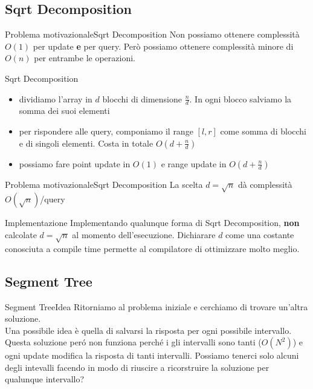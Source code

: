 \documentclass[compress]{beamer}
\begin{document}
\subsection{Sqrt Decomposition}
\begin{frame}{Problema motivazionale}{Sqrt Decomposition}
    Non possiamo ottenere complessit\`a $O(1)$ per update \textbf{e} per query. Per\`o possiamo ottenere complessit\`a minore di $O(n)$ per entrambe le operazioni.
    \pause
    \begin{block}{Sqrt Decomposition}
        \begin{itemize}
        \item dividiamo l'array in $d$ blocchi di dimensione $\frac{n}{d}$. In ogni blocco salviamo la somma dei suoi elementi
        \pause
        \item per rispondere alle query, componiamo il range $[l, r]$ come somma di blocchi e di singoli elementi. Costa in totale $O(d + \frac{n}{d})$
        \pause
        \item possiamo fare point update in $O(1)$ e range update in $O(d + \frac{n}{d})$
        \end{itemize}
    \end{block}
\end{frame}

\begin{frame}{Problema motivazionale}{Sqrt Decomposition}
    La scelta $d = \sqrt{n}$ d\`a complessit\`a $O(\sqrt{n})$/query
    \vfill
    \vfill
    \begin{alertblock}{Implementazione}
        Implementando qualunque forma di Sqrt Decomposition, \textbf{non} calcolate $d = \sqrt{n}$ al momento dell'esecuzione. Dichiarare $d$ come una costante conosciuta a compile time permette al compilatore di ottimizzare molto meglio.
    \end{alertblock}
\end{frame}

\subsection{Segment Tree}
\begin{frame}{Segment Tree}{Idea}
    Ritorniamo al problema iniziale e cerchiamo di trovare un'altra soluzione.\\
    \pause
    Una possibile idea \`e quella di salvarsi la risposta per ogni possibile intervallo.\\
    \pause
    Questa soluzione per\'o non funziona perché i gli intervalli sono tanti ($O(N^2)$) e ogni update modifica la risposta di tanti intervalli.
    \pause
    Possiamo tenerci solo alcuni degli intevalli facendo in modo di riuscire a ricorstruire la soluzione per qualunque intervallo?
    \pause
    
\end{frame}
\end{document}

